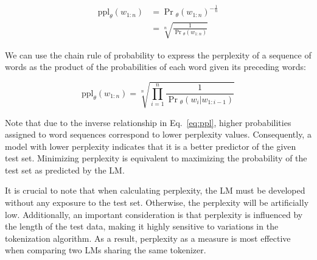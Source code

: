 \begin{align} \label{eq:ppl}
    \text{ppl}_{\theta}(w_{1:n}) &= \Pr{}_{\theta}(w_{1:n})^{-\frac{1}{n}} \\
                                 &= \sqrt[n]{\frac{1}{\Pr{}_{\theta}(w_{1:n})}}
\end{align}

We can use the chain rule of probability to express the perplexity of a sequence
of words as the product of the probabilities of each word given its preceding
words:

\begin{equation}
    \text{ppl}_{\theta}(w_{1:n}) = 
    \sqrt[n]{\prod_{i=1}^{n} \frac{1}{\Pr{}_{\theta}(w_i | w_{1:i-1})}}
\end{equation}

Note that due to the inverse relationship in Eq.~\ref{eq:ppl}, higher
probabilities assigned to word sequences correspond to lower perplexity values.
Consequently, a model with lower perplexity indicates that it is a better
predictor of the given test set. Minimizing perplexity is equivalent to
maximizing the probability of the test set as predicted by the LM.

It is crucial to note that when calculating perplexity, the LM must be developed
without any exposure to the test set. Otherwise, the perplexity will be
artificially low. Additionally, an important consideration is that perplexity is
influenced by the length of the test data, making it highly sensitive to
variations in the tokenization algorithm. As a result, perplexity as a measure
is most effective when comparing two LMs sharing the same tokenizer.
